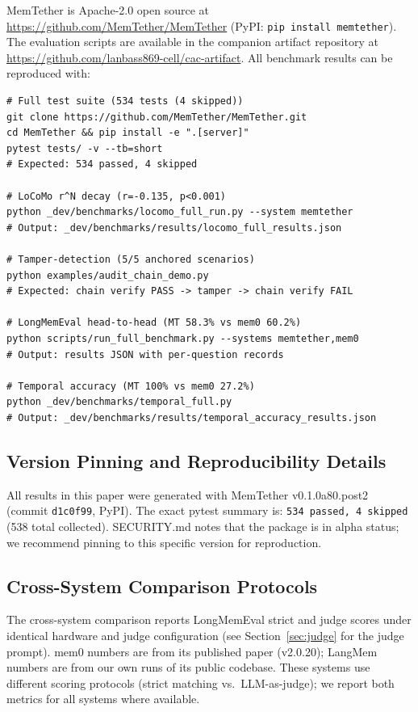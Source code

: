 \documentclass{article}
\begin{document}
MemTether is Apache-2.0 open source at \url{https://github.com/MemTether/MemTether} (PyPI: \texttt{pip install memtether}). The evaluation scripts are available in the companion artifact repository at \url{https://github.com/lanbass869-cell/cac-artifact}. All benchmark results can be reproduced with:

\begin{verbatim}
# Full test suite (534 tests (4 skipped))
git clone https://github.com/MemTether/MemTether.git
cd MemTether && pip install -e ".[server]"
pytest tests/ -v --tb=short
# Expected: 534 passed, 4 skipped

# LoCoMo r^N decay (r=-0.135, p<0.001)
python _dev/benchmarks/locomo_full_run.py --system memtether
# Output: _dev/benchmarks/results/locomo_full_results.json

# Tamper-detection (5/5 anchored scenarios)
python examples/audit_chain_demo.py
# Expected: chain verify PASS -> tamper -> chain verify FAIL

# LongMemEval head-to-head (MT 58.3% vs mem0 60.2%)
python scripts/run_full_benchmark.py --systems memtether,mem0
# Output: results JSON with per-question records

# Temporal accuracy (MT 100% vs mem0 27.2%)
python _dev/benchmarks/temporal_full.py
# Output: _dev/benchmarks/results/temporal_accuracy_results.json
\end{verbatim}
\subsection{Version Pinning and Reproducibility Details}

All results in this paper were generated with MemTether v0.1.0a80.post2 (commit \texttt{d1c0f99}, PyPI). The exact pytest summary is: \texttt{534 passed, 4 skipped} (538 total collected). SECURITY.md notes that the package is in alpha status; we recommend pinning to this specific version for reproduction.

\subsection{Cross-System Comparison Protocols}

The cross-system comparison reports LongMemEval strict and judge scores under identical hardware and judge configuration (see Section~\ref{sec:judge} for the judge prompt). mem0 numbers are from its published paper (v2.0.20); LangMem numbers are from our own runs of its public codebase. These systems use different scoring protocols (strict matching vs.\ LLM-as-judge); we report both metrics for all systems where available.
\end{document}
